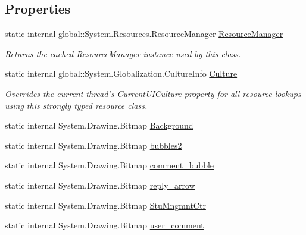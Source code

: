 \subsection*{\-Properties}
\begin{DoxyCompactItemize}
\item 
static internal \*
global\-::\-System.\-Resources.\-Resource\-Manager \hyperlink{class_sr_p___classroom_inq_1_1_properties_1_1_resources_a7809b92866e9561f253e4829dc02560f}{\-Resource\-Manager}
\begin{DoxyCompactList}\small\item\em \-Returns the cached \-Resource\-Manager instance used by this class. \end{DoxyCompactList}\item 
static internal \*
global\-::\-System.\-Globalization.\-Culture\-Info \hyperlink{class_sr_p___classroom_inq_1_1_properties_1_1_resources_a1788010aa2d65a3c3244ec2f6ccd20ed}{\-Culture}
\begin{DoxyCompactList}\small\item\em \-Overrides the current thread's \-Current\-U\-I\-Culture property for all resource lookups using this strongly typed resource class. \end{DoxyCompactList}\item 
static internal \*
\-System.\-Drawing.\-Bitmap \hyperlink{class_sr_p___classroom_inq_1_1_properties_1_1_resources_a16ac92929f55281abad59488efae062b}{\-Background}
\item 
static internal \*
\-System.\-Drawing.\-Bitmap \hyperlink{class_sr_p___classroom_inq_1_1_properties_1_1_resources_ae15d966afaa44ab7f083fa1bb1cf1c82}{bubbles2}
\item 
static internal \*
\-System.\-Drawing.\-Bitmap \hyperlink{class_sr_p___classroom_inq_1_1_properties_1_1_resources_a2ca7de7a89e9cc488bc2e7ca92f49c94}{comment\-\_\-bubble}
\item 
static internal \*
\-System.\-Drawing.\-Bitmap \hyperlink{class_sr_p___classroom_inq_1_1_properties_1_1_resources_ab0a3e726876b922e1691be1f3853b481}{reply\-\_\-arrow}
\item 
static internal \*
\-System.\-Drawing.\-Bitmap \hyperlink{class_sr_p___classroom_inq_1_1_properties_1_1_resources_a8936df34fac714793207e165f0e1abb3}{\-Stu\-Mngmnt\-Ctr}
\item 
static internal \*
\-System.\-Drawing.\-Bitmap \hyperlink{class_sr_p___classroom_inq_1_1_properties_1_1_resources_a640888878348ec44e2974837abb13f97}{user\-\_\-comment}
\end{DoxyCompactItemize}
